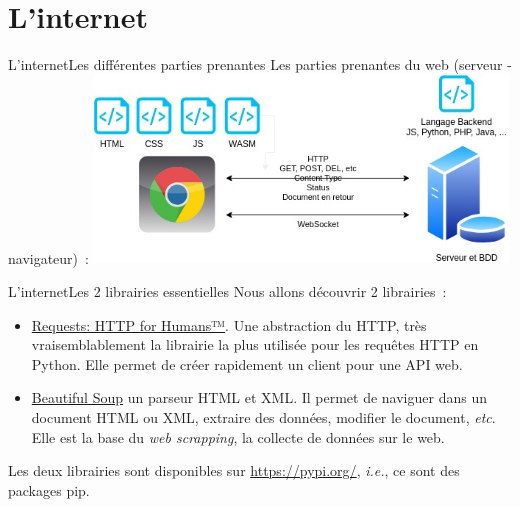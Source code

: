 \documentclass{beamer}
\begin{document}
    \section{L'internet}\label{sec:internet}

    \begin{frame}{L'internet}{Les différentes parties prenantes}
        Les parties prenantes du web (serveur - navigateur)~:
        \bigbreak
        \centering
        \includegraphics[width=11cm]{image/web-stakeholders}
    \end{frame}

    \begin{frame}{L'internet}{Les 2 librairies essentielles}
        Nous allons découvrir 2 librairies~:
        \begin{itemize}
            \item \href{https://requests.readthedocs.io/en/latest/}{Requests: HTTP for Humans™}.
            Une abstraction du HTTP, très vraisemblablement la librairie la plus utilisée pour les requêtes HTTP en Python.
            Elle permet de créer rapidement un client pour une API web.
            \item \href{https://www.crummy.com/software/BeautifulSoup/bs4/doc/}{Beautiful Soup} un parseur HTML et XML.
            Il permet de naviguer dans un document HTML ou XML, extraire des données, modifier le document, \textit{etc}.
            Elle est la base du \textit{web scrapping}, la collecte de données sur le web.
        \end{itemize}
        \bigbreak
        Les deux librairies sont disponibles sur \url{https://pypi.org/}, \textit{i.e.}, ce sont des packages pip.
    \end{frame}
\end{document}
